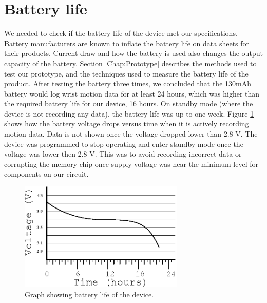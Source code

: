 \section{Battery life}
\label{Sec:ResultsBatteryLife}
We needed to check if the battery life of the device met our specifications.
Battery manufacturers are known to inflate the battery life on data sheets for their products.
Current draw and how the battery is used also changes the output capacity of the battery.
Section \ref{Chap:Prototype} describes the methods used to test our prototype,
and the techniques used to measure the battery life of the product.
After testing the battery three times,
we concluded that the 130mAh battery would log wrist motion data for at least 24 hours,
which was higher than the required battery life for our device,
16 hours.
On standby mode (where the device is not recording any data), the battery life was up to one week.
Figure \ref{Fig:BatteryGraph} shows how the battery voltage drops versus time when it is actively recording motion data.
Data is not shown once the voltage dropped lower than 2.8 V.
The device was programmed to stop operating and enter standby mode
once the voltage was lower then 2.8 V.
This was to avoid recording incorrect data or corrupting the memory chip once supply
voltage was near the minimum level for components on our circuit.

\begin{figure}
\begin{center}
\includegraphics[width=0.7\textwidth]{images/BattLife.eps}
\caption{Graph showing battery life of the device.}
\label{Fig:BatteryGraph}
\end{center}
\end{figure}

